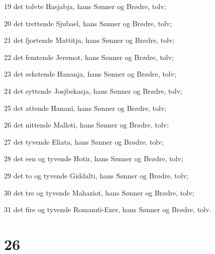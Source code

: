 \par 19 det tolvte Hasjabja, hans Sønner og Brødre, tolv;
\par 20 det trettende Sjubael, hans Sønner og Brødre, tolv;
\par 21 det fjortende Mattitja, hans Sønner og Brødre, tolv;
\par 22 det femtende Jeremot, hans Sønner og Brødre, tolv;
\par 23 det sekstende Hananja, hans Sønner og Brødre, tolv;
\par 24 det syttende Josjbekasja, hans Sønner og Brødre, tolv;
\par 25 det attende Hanani, hans Sønner og Brødre, tolv;
\par 26 det nittende Malloti, hans Sønner og Brødre, tolv;
\par 27 det tyvende Eliata, hans Sønner og Brødre, tolv;
\par 28 det een og tyvende Hotir, hans Sønner og Brødre, tolv;
\par 29 det to og tyvende Giddalti, hans Sønner og Brødre, tolv;
\par 30 det tre og tyvende Mahaziot, hans Sønner og Brødre, tolv;
\par 31 det fire og tyvende Romamti-Ezer, hans Sønner og Brødre, tolv.

\chapter{26}

